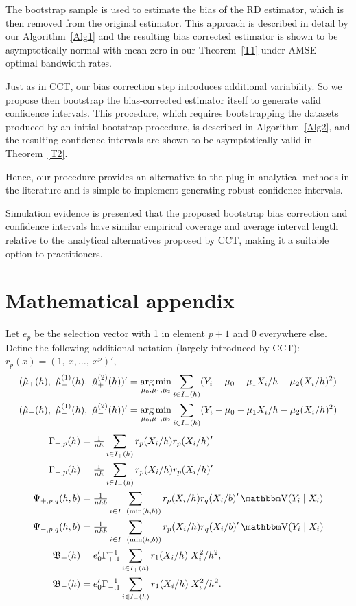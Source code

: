 \documentclass[12pt,fleqn]{article}
\begin{document}
The bootstrap sample is used to estimate the bias of the RD estimator, which is then removed from the original estimator.
 This approach is described in detail by our Algorithm~\ref{Alg1} and the resulting bias corrected estimator is shown to be asymptotically normal with mean zero in our
Theorem~\ref{T1} under AMSE-optimal bandwidth rates.

Just as in CCT, our bias correction step introduces additional variability.  So we propose then bootstrap the bias-corrected estimator itself to
 generate valid confidence intervals. This procedure, which requires bootstrapping the datasets produced by an initial bootstrap procedure, is described in Algorithm~\ref{Alg2},
 and the resulting confidence intervals are shown to be asymptotically valid in Theorem~\ref{T2}.

 Hence, our procedure provides an alternative to the plug-in analytical methods in the literature and is simple to implement generating robust confidence intervals.

Simulation evidence is presented that the proposed bootstrap bias correction and confidence intervals have similar empirical coverage and average interval length relative to
 the analytical alternatives proposed by CCT, making it a suitable option to practitioners.

\newpage
\appendix
\section{Mathematical appendix}
Let $e_p$ be the selection vector with 1 in element $p+1$ and 0
everywhere else. Define the following additional notation (largely
introduced by CCT): $r_p(x) = (1,\ x,\dots,\ x^p)'$,
\begin{align*}
  (\hat{\mu}_{+}(h),\ \hat{\mu}_{+}^{(1)}(h),\ \hat\mu_{+}^{(2)}(h))'
  &= \argmin_{\mu_0, \mu_1, \mu_2} \ssum[+]{i}{h}
    (Y_i - \mu_0 - \mu_1 X_i/h - \mu_2 (X_i/h)^2) \\
  (\hat{\mu}_{-}(h),\ \hat{\mu}_{-}^{(1)}(h),\ \hat\mu_{-}^{(2)}(h))'
  &= \argmin_{\mu_0, \mu_1, \mu_2} \ssum[-]{i}{h}
    (Y_i - \mu_0 - \mu_1 X_i/h - \mu_2 (X_i/h)^2)
\end{align*}
\begin{align}
  \notag
  \Gamma_{+,p}(h) &= \tfrac{1}{nh} \ssum[+]{i}{h} r_p(X_i/h) r_p(X_i/h)' \\
  \notag
  \Gamma_{-,p}(h) &= \tfrac{1}{nh} \ssum[-]{i}{h} r_p(X_i/h) r_p(X_i/h)' \\
  \notag
  \Psi_{+,p,q}(h,b)
  &= \tfrac{1}{nhb} \ssum[+]{i}{\min(h,b)} r_p(X_i/h) r_q(X_i/b)'
    \V(Y_i \mid X_i) \\
  \notag
  \Psi_{-,p,q}(h,b)
  &= \tfrac{1}{nhb} \ssum[-]{i}{\min(h,b)} r_p(X_i/h) r_q(X_i/b)'
    \V(Y_i \mid X_i) \\
  \label{eq:5}
  \Bf_+(h)
  & = e_0' \Gamma_{+,1}^{-1}
    \ssum[+]{i}{h} r_1(X_i/h) \; X_i^2 / h^2, \\
  \label{eq:6}
  \Bf_-(h)
  & = e_0' \Gamma_{-,1}^{-1}
    \ssum[-]{i}{h} r_1(X_i/h) \; X_i^2 / h^2.
\end{align}
\end{document}
